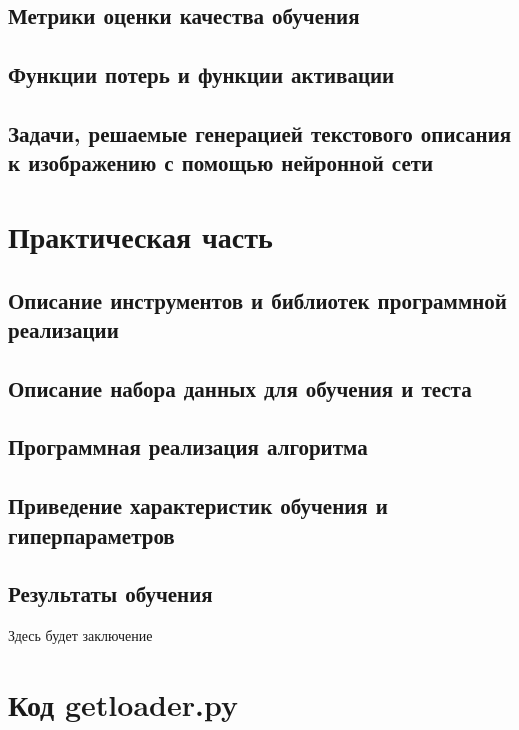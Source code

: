 \documentclass[bachelor, och, coursework]{SCWorks}
\begin{document}
    \subsection{Метрики оценки качества обучения}
    \subsection{Функции потерь и функции активации}
    \subsection{Задачи, решаемые генерацией текстового описания к изображению с помощью нейронной сети}

\section{Практическая часть}

    \subsection{Описание инструментов и библиотек программной реализации}

    \subsection{Описание набора данных для обучения и теста}

    \subsection{Программная реализация алгоритма}

    \subsection{Приведение характеристик обучения и гиперпараметров}

    \subsection{Результаты обучения}

\conclusion

    Здесь будет заключение

\appendix

    \section{Код getloader.py}
    \inputminted[fontsize=\footnotesize]{python}{model-ver-2/getloader.py}
\end{document}
